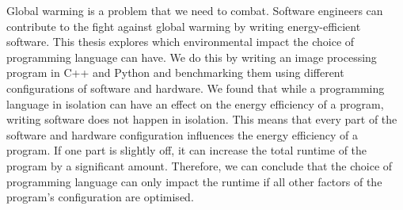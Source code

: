 Global warming is a problem that we need to combat. Software engineers can contribute to the fight against global warming by writing energy-efficient software. This thesis explores which environmental impact the choice of programming language can have. We do this by writing an image processing program in C++ and Python and benchmarking them using different configurations of software and hardware. We found that while a programming language in isolation can have an effect on the energy efficiency of a program, writing software does not happen in isolation. This means that every part of the software and hardware configuration influences the energy efficiency of a program. If one part is slightly off, it can increase the total runtime of the program by a significant amount. Therefore, we can conclude that the choice of programming language can only impact the runtime if all other factors of the program's configuration are optimised.
